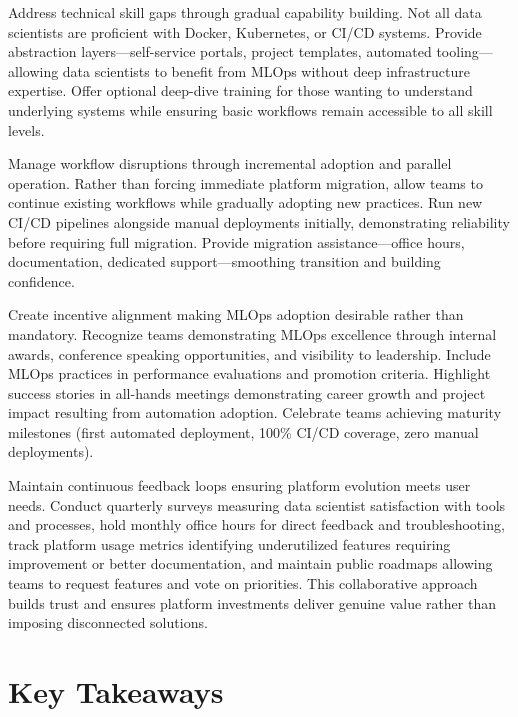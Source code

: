 Address technical skill gaps through gradual capability building. Not all data scientists are proficient with Docker, Kubernetes, or CI/CD systems. Provide abstraction layers---self-service portals, project templates, automated tooling---allowing data scientists to benefit from MLOps without deep infrastructure expertise. Offer optional deep-dive training for those wanting to understand underlying systems while ensuring basic workflows remain accessible to all skill levels.

Manage workflow disruptions through incremental adoption and parallel operation. Rather than forcing immediate platform migration, allow teams to continue existing workflows while gradually adopting new practices. Run new CI/CD pipelines alongside manual deployments initially, demonstrating reliability before requiring full migration. Provide migration assistance---office hours, documentation, dedicated support---smoothing transition and building confidence.

Create incentive alignment making MLOps adoption desirable rather than mandatory. Recognize teams demonstrating MLOps excellence through internal awards, conference speaking opportunities, and visibility to leadership. Include MLOps practices in performance evaluations and promotion criteria. Highlight success stories in all-hands meetings demonstrating career growth and project impact resulting from automation adoption. Celebrate teams achieving maturity milestones (first automated deployment, 100\% CI/CD coverage, zero manual deployments).

Maintain continuous feedback loops ensuring platform evolution meets user needs. Conduct quarterly surveys measuring data scientist satisfaction with tools and processes, hold monthly office hours for direct feedback and troubleshooting, track platform usage metrics identifying underutilized features requiring improvement or better documentation, and maintain public roadmaps allowing teams to request features and vote on priorities. This collaborative approach builds trust and ensures platform investments deliver genuine value rather than imposing disconnected solutions.

\section{Key Takeaways}

